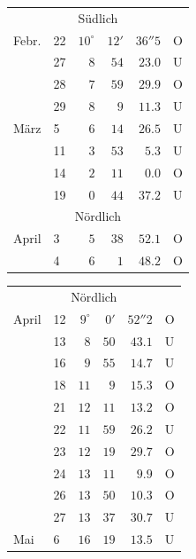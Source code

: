 \begin{center}
\begin{tabular}{ll|r r r l}
\multicolumn{6}{c}{Südlich} \\
Febr. & 22 & $10^\circ$ & $12'$ & $36''5$ & O \\
 & 27 & $8$ & $54$ & $23.0$ & U \\
 & 28 & $7$ & $59$ & $29.9$ & O \\
 & 29 & $8$ & $9$ & $11.3$ & U \\
März & 5 & $6$ & $14$ & $26.5$ & U \\
 & 11 & $3$ & $53$ & $5.3$ & U \\
 & 14 & $2$ & $11$ & $0.0$ & O \\
 & 19 & $0$ & $44$ & $37.2$ & U \\
\multicolumn{6}{c}{Nördlich} \\
April & 3 & $5$ & $38$ & $52.1$ & O \\
 & 4 & $6$ & $1$ & $48.2$ & O \\
\end{tabular}
\end{center}

\begin{center}
\begin{tabular}{ll|r r r l}
\multicolumn{6}{c}{Nördlich} \\
April & 12 & $9^\circ$ & $0'$ & $52''2$ & O \\
 & 13 & $8$ & $50$ & $43.1$ & U \\
 & 16 & $9$ & $55$ & $14.7$ & U \\
 & 18 & $11$ & $9$ & $15.3$ & O \\
 & 21 & $12$ & $11$ & $13.2$ & O \\
 & 22 & $11$ & $59$ & $26.2$ & U \\
 & 23 & $12$ & $19$ & $29.7$ & O \\
 & 24 & $13$ & $11$ & $9.9$ & O \\
 & 26 & $13$ & $50$ & $10.3$ & O \\
 & 27 & $13$ & $37$ & $30.7$ & U \\
Mai & 6 & $16$ & $19$ & $13.5$ & U \\
\end{tabular}
\end{center}

